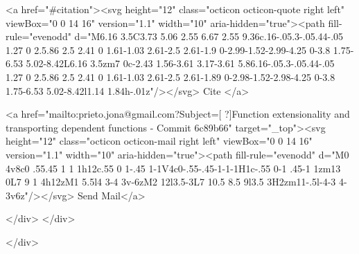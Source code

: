       <a  href="#citation"><svg height="12" class="octicon octicon-quote right left" viewBox="0 0 14 16" version="1.1" width="10" aria-hidden="true"><path fill-rule="evenodd" d="M6.16 3.5C3.73 5.06 2.55 6.67 2.55 9.36c.16-.05.3-.05.44-.05 1.27 0 2.5.86 2.5 2.41 0 1.61-1.03 2.61-2.5 2.61-1.9 0-2.99-1.52-2.99-4.25 0-3.8 1.75-6.53 5.02-8.42L6.16 3.5zm7 0c-2.43 1.56-3.61 3.17-3.61 5.86.16-.05.3-.05.44-.05 1.27 0 2.5.86 2.5 2.41 0 1.61-1.03 2.61-2.5 2.61-1.89 0-2.98-1.52-2.98-4.25 0-3.8 1.75-6.53 5.02-8.42l1.14 1.84h-.01z"/></svg> Cite
      </a>

      <a href="mailto:prieto.jona@gmail.com?Subject=[ ?]Function extensionality and transporting dependent functions  - Commit 6c89b66" target="_top"><svg height="12" class="octicon octicon-mail right left" viewBox="0 0 14 16" version="1.1" width="10" aria-hidden="true"><path fill-rule="evenodd" d="M0 4v8c0 .55.45 1 1 1h12c.55 0 1-.45 1-1V4c0-.55-.45-1-1-1H1c-.55 0-1 .45-1 1zm13 0L7 9 1 4h12zM1 5.5l4 3-4 3v-6zM2 12l3.5-3L7 10.5 8.5 9l3.5 3H2zm11-.5l-4-3 4-3v6z"/></svg> Send Mail</a>

    </div>
  </div>

</div>




